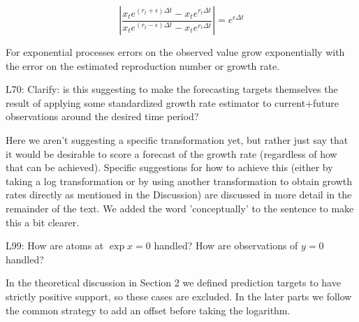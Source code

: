 \documentclass{article}
\newcommand{\black}{\color{black}}
\newcommand{\blue}{\color{blue}}
\newcommand{\notindented}{\setlength{\leftskip}{0cm}}
\begin{document}
\begin{equation}
\left| \frac{x_t e^{(r_t + \epsilon) \Delta t} - x_t e^{r_t \Delta t}}{x_t e^{(r_t - \epsilon) \Delta t} - x_t e^{r_t \Delta t}} \right| = e^{\epsilon\Delta t}
\end{equation}

For exponential processes errors on the observed value grow exponentially with the error on the estimated reproduction number or growth rate.

\notindented
\blue
L70: Clarify: is this suggesting to make the forecasting targets themselves the result of applying some standardized growth rate estimator to current+future observations around the desired time period?

\black 
Here we aren't suggesting a specific transformation yet, but rather just say that it would be desirable to score a forecast of the growth rate (regardless of how that can be achieved). Specific suggestions for how to achieve this (either by taking a log transformation or by using another transformation to obtain growth rates directly as mentioned in the Discussion) are discussed in more detail in the remainder of the text. We added the word 'conceptually' to the sentence to make this a bit clearer. 

\blue
L99: How are atoms at $\exp x = 0$ handled? How are observations of $y = 0$ handled?

\black
In the theoretical discussion in Section 2 we defined prediction targets to have strictly positive support, so these cases are excluded. In the later parts we follow the common strategy to add an offset before taking the logarithm. 

\blue
\end{document}
